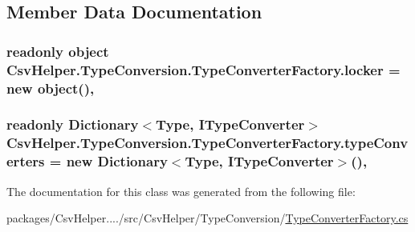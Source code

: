 \subsection{Member Data Documentation}
\hypertarget{a00153_aae823641d64f44cf1a79573bb55a5090}{
\subsubsection[{locker}]{\setlength{\rightskip}{0pt plus 5cm}readonly object Csv\-Helper.\-Type\-Conversion.\-Type\-Converter\-Factory.\-locker = new object()\hspace{0.3cm}{\ttfamily [static]}, {\ttfamily [private]}}}\label{a00153_aae823641d64f44cf1a79573bb55a5090}
\hypertarget{a00153_a5229fe94e2acf6302b733c3d114f187e}{
\subsubsection[{type\-Converters}]{\setlength{\rightskip}{0pt plus 5cm}readonly Dictionary$<$Type, {\bf I\-Type\-Converter}$>$ Csv\-Helper.\-Type\-Conversion.\-Type\-Converter\-Factory.\-type\-Converters = new Dictionary$<$Type, {\bf I\-Type\-Converter}$>$()\hspace{0.3cm}{\ttfamily [static]}, {\ttfamily [private]}}}\label{a00153_a5229fe94e2acf6302b733c3d114f187e}


The documentation for this class was generated from the following file\-:\begin{DoxyCompactItemize}
\item 
packages/\-Csv\-Helper..../src/\-Csv\-Helper/\-Type\-Conversion/\hyperlink{a00245}{Type\-Converter\-Factory.\-cs}\end{DoxyCompactItemize}

